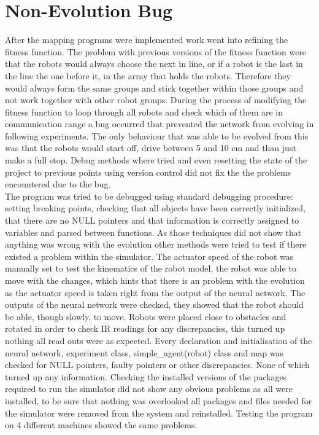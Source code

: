 \section{Non-Evolution Bug}
After the mapping programs were implemented work went into refining the fitness function. 
The problem with previous versions of the fitness function were that the robots would always choose the next in line, or if a robot is the last in the line the one before it, in the array that holds the robots. Therefore they would always form the  same groups and stick together within those groups and not work together with other robot groups.
During the process of modifying the fitness function to loop through all robots and check which of them are in communication range a bug occurred that prevented the network from evolving in following experiments. 
The only behaviour that was able to be evolved from this was that the robots would start off, drive between 5 and 10 cm and than just make a full stop.
Debug methods where tried and even resetting the state of the project to previous points using version control did not fix the the problems encountered due to the bug. \\

The program was tried to be debugged using standard debugging procedure: setting breaking points, checking that all objects have been correctly initialized, that there are no NULL pointers and that information is correctly assigned to variables and parsed between functions.
As those techniques did not show that anything was wrong with the evolution other methods were tried to test if there existed a problem within the simulator.
The actuator speed of the robot was manually set to test the kinematics of the robot model, the robot was able to move with the changes, which hints that there is an problem with the evolution as the actuator speed is taken right from the output of the neural network.
The outputs of the neural network were checked, they showed that the robot should be able, though slowly, to move. 
Robots were placed close to obstacles and rotated in order to check IR readings for any discrepancies, this turned up nothing all read outs were as expected.
Every declaration and initialisation of the neural network, experiment class, simple\_agent(robot) class and map was checked for NULL pointers, faulty pointers or other discrepancies. None of which turned up any information.
Checking the installed versions of the packages required to run the simulator did not show any obvious problems as all were installed, to be sure that nothing was overlooked all packages and files needed for the simulator were removed from the system and reinstalled.
Testing the program on 4 different machines showed the same problems. \\

